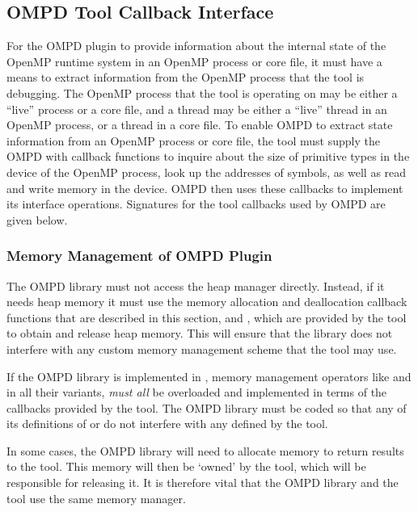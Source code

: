 \subsection{OMPD Tool Callback Interface}
\label{ompd:ompd-tool-callback-interface}

For the OMPD plugin to provide information about the internal state
of the OpenMP runtime system in an OpenMP process or core file,
it must have a means to extract information from
the OpenMP process that the tool is debugging.
The OpenMP process that the tool is operating on may be either a ``live'' process or a core file,
and a thread may be either a ``live'' thread in an OpenMP process,
or a thread in a core file.
To enable OMPD to extract state information from an OpenMP process or core file,
the tool must supply the OMPD with callback functions to inquire
about the size of primitive types in the device of the OpenMP process,
look up the addresses of symbols,
as well as read and write memory in the device.
OMPD then uses these callbacks to implement its interface operations.
Signatures for the tool callbacks used by OMPD are given below.

\subsubsection{Memory Management of OMPD Plugin}
The OMPD library must not access the heap manager directly. Instead, if it needs heap memory it 
must use the memory allocation and deallocation callback functions that are described in this 
section,  and ,  which are 
provided by the tool to obtain and release heap memory. This will ensure that the library does not 
interfere with any custom memory management scheme that the tool may use.

If the OMPD library is implemented in , memory management operators like  
and  in all their variants, \emph{must all} be overloaded and implemented in terms of 
the callbacks provided by the tool. The OMPD library must be coded so that any of its 
definitions of  or  do not interfere with any defined by the tool.

In some cases, the OMPD library will need to allocate memory to return results to the
tool. This memory will then be `owned' by the tool, which will be responsible for releasing it. It is 
therefore vital that the OMPD library and the tool use the same memory manager.


